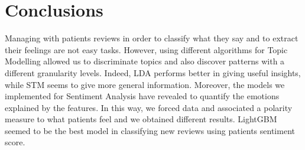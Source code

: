 \documentclass[10pt, a4paper, twocolumn]{article}
\begin{document}
    \section{Conclusions}
        Managing with patients reviews in order to classify what they say and to extract their feelings are not easy tasks. However, using different algorithms for Topic Modelling allowed us to discriminate topics and also discover patterns with a different granularity levels. Indeed, LDA performs better in giving useful insights, while STM seems to give more general information. Moreover, the models we implemented for Sentiment Analysis have revealed to quantify the emotions explained by the features. In this way, we forced data and associated a polarity measure to what patients feel and we obtained different results. LightGBM seemed to be the best model in classifying new reviews using patients sentiment score. 
    

 
    
\end{document}
